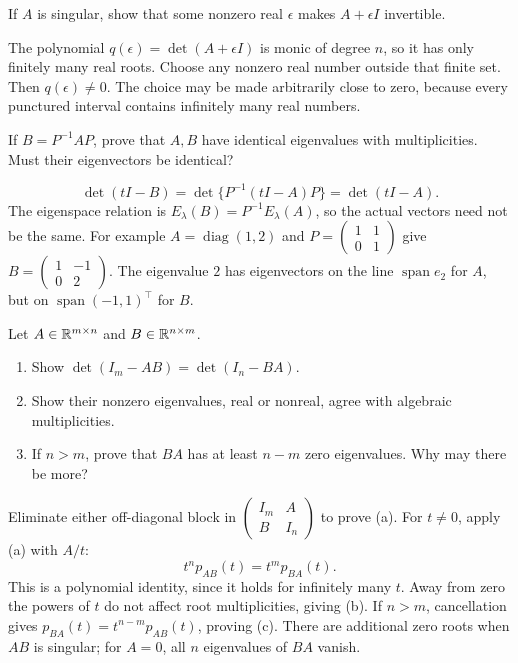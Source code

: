 \begin{problem}\label{ex:08:perturbation}
If \(A\) is singular, show that some nonzero real \(\epsilon\) makes
\(A+\epsilon I\) invertible.
\end{problem}
\begin{solution}
The polynomial \(q(\epsilon)=\det(A+\epsilon I)\) is monic of degree \(n\),
so it has only finitely many real roots. Choose any nonzero real number
outside that finite set. Then \(q(\epsilon)\ne0\).
The choice may be made arbitrarily close to zero, because every punctured
interval contains infinitely many real numbers.
\end{solution}

\begin{problem}\label{ex:08:similarity}
If \(B=P^{-1}AP\), prove that \(A,B\) have identical eigenvalues with
multiplicities. Must their eigenvectors be identical?
\end{problem}
\begin{solution}
\[
 \det(tI-B)=\det\{P^{-1}(tI-A)P\}=\det(tI-A).
\]
The eigenspace relation is \(E_\lambda(B)=P^{-1}E_\lambda(A)\), so
the actual vectors need not be the same.
For example \(A=\operatorname{diag}(1,2)\) and
\(P=\begin{pmatrix}1&1\\0&1\end{pmatrix}\) give
\(B=\begin{pmatrix}1&-1\\0&2\end{pmatrix}\).
The eigenvalue \(2\) has eigenvectors on the line \(\operatorname{span}e_2\)
for \(A\), but on \(\operatorname{span}(-1,1)^\top\) for \(B\).
\end{solution}

\begin{problem}\label{ex:08:ab-ba}
Let \(A\in\mathbb R^{m\times n}\) and \(B\in\mathbb R^{n\times m}\).
\begin{enumerate}
\item Show \(\det(I_m-AB)=\det(I_n-BA)\).
\item Show their nonzero eigenvalues, real or nonreal, agree with algebraic
multiplicities.
\item If \(n>m\), prove that \(BA\) has at least \(n-m\) zero eigenvalues.
Why may there be more?
\end{enumerate}
\end{problem}
\begin{solution}
Eliminate either off-diagonal block in
\(\begin{pmatrix}I_m&A\\B&I_n\end{pmatrix}\) to prove (a).
For \(t\ne0\), apply (a) with \(A/t\):
\[
 t^n p_{AB}(t)=t^m p_{BA}(t).
\]
This is a polynomial identity, since it holds for infinitely many \(t\).
Away from zero the powers of \(t\) do not affect root multiplicities,
giving (b). If \(n>m\), cancellation gives
\(p_{BA}(t)=t^{n-m}p_{AB}(t)\), proving (c).
There are additional zero roots when \(AB\) is singular; for \(A=0\),
all \(n\) eigenvalues of \(BA\) vanish.
\end{solution}

